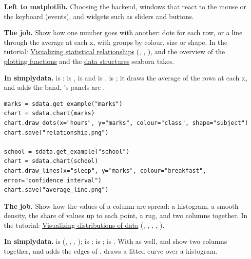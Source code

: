 \textbf{Left to matplotlib.} Choosing the backend, windows that react to the mouse or the keyboard
(events), and widgets such as sliders and buttons.


\textbf{The job.} Show how one number goes with another: dots for each row, or a line through the
average at each x, with groups by colour, size or shape. In the tutorial:
\href{https://seaborn.pydata.org/tutorial/relational.html}{Visualizing statistical relationships}
(, , ), and the overview of the
\href{https://seaborn.pydata.org/tutorial/function_overview.html}{plotting functions} and the
\href{https://seaborn.pydata.org/tutorial/data_structure.html}{data structures} seaborn takes.

\textbf{In simplydata.}  is :  is ,
 is  and  is .  is
; it draws the average of the rows at each x, and  adds the band.
's panels are .

\begin{lstlisting}[style=py]
marks = sdata.get_example("marks")
chart = sdata.chart(marks)
chart.draw_dots(x="hours", y="marks", colour="class", shape="subject")
chart.save("relationship.png")

school = sdata.get_example("school")
chart = sdata.chart(school)
chart.draw_lines(x="sleep", y="marks", colour="breakfast", error="confidence interval")
chart.save("average_line.png")
\end{lstlisting}


\textbf{The job.} Show how the values of a column are spread: a histogram, a smooth density, the
share of values up to each point, a rug, and two columns together. In the tutorial:
\href{https://seaborn.pydata.org/tutorial/distributions.html}{Visualizing distributions of data}
(, , , , ).

\textbf{In simplydata.}  is  (,
, , );  is
;  is ;  is
. With  as well,  and  show two
columns together, and  adds the edges of .
 draws a fitted curve over a histogram.

